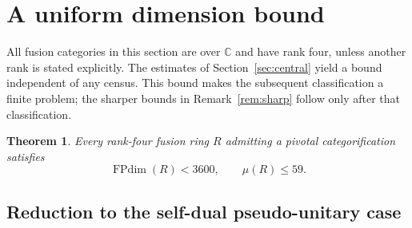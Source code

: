 \documentclass[11pt]{amsart}
\newtheorem{theorem}{Theorem}[section]
\theoremstyle{definition}
\DeclareMathOperator{\FPdim}{FPdim}
\newcommand{\C}{\mathbb C}
\numberwithin{equation}{section}
\begin{document}
\section{A uniform dimension bound}\label{sec:uniform}
All fusion categories in this section are over $\C$ and have rank four,
unless another rank is stated explicitly. The estimates of
Section~\ref{sec:central} yield a bound independent of
any census. This bound makes the subsequent classification a finite
problem; the sharper bounds in Remark~\ref{rem:sharp} follow only
after that classification.
\begin{theorem}\label{thm:uniform}
Every rank-four fusion ring $R$ admitting a pivotal categorification satisfies
\[
 \FPdim(R)<3600,\qquad \mu(R)\leq59.
\]
\end{theorem}
\subsection{Reduction to the self-dual pseudo-unitary case}\label{sec:pivotal-reduction}
\end{document}

